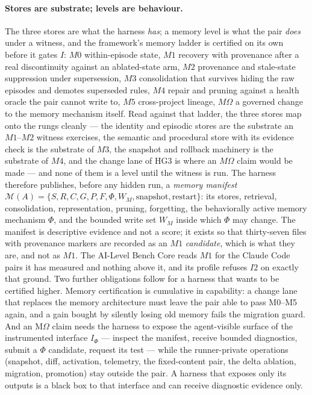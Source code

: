 \paragraph{Stores are substrate; levels are behaviour.} The three stores are what the harness \emph{has}; a memory level is what the pair \emph{does} under a witness, and the framework's memory ladder is certified on its own before it gates $I$: $M0$ within-episode state, $M1$ recovery with provenance after a real discontinuity against an ablated-state arm, $M2$ provenance and stale-state suppression under supersession, $M3$ consolidation that survives hiding the raw episodes and demotes superseded rules, $M4$ repair and pruning against a health oracle the pair cannot write to, $M5$ cross-project lineage, $M\Omega$ a governed change to the memory mechanism itself. Read against that ladder, the three stores map onto the rungs cleanly --- the identity and episodic stores are the substrate an $M1$--$M2$ witness exercises, the semantic and procedural store with its evidence check is the substrate of $M3$, the snapshot and rollback machinery is the substrate of $M4$, and the change lane of HG3 is where an $M\Omega$ claim would be made --- and none of them is a level until the witness is run. The harness therefore publishes, before any hidden run, a \emph{memory manifest} $\mathcal M(A) = \{S, R, C, G, P, F, \Phi, W_M, \text{snapshot}, \text{restart}\}$: its stores, retrieval, consolidation, representation, pruning, forgetting, the behaviorally active memory mechanism $\Phi$, and the bounded write set $W_M$ inside which $\Phi$ may change. The manifest is descriptive evidence and not a score; it exists so that thirty-seven files with provenance markers are recorded as an $M1$ \emph{candidate}, which is what they are, and not as $M1$. The AI-Level Bench Core reads $M1$ for the Claude Code pairs it has measured and nothing above it, and its profile refuses $I2$ on exactly that ground. Two further obligations follow for a harness that wants to be certified higher. Memory certification is cumulative in capability: a change lane that replaces the memory architecture must leave the pair able to pass M0--M5 again, and a gain bought by silently losing old memory fails the migration guard. And an M$\Omega$ claim needs the harness to expose the agent-visible surface of the instrumented interface $I_\Phi$ --- inspect the manifest, receive bounded diagnostics, submit a $\Phi$ candidate, request its test --- while the runner-private operations (snapshot, diff, activation, telemetry, the fixed-content pair, the delta ablation, migration, promotion) stay outside the pair. A harness that exposes only its outputs is a black box to that interface and can receive diagnostic evidence only.

